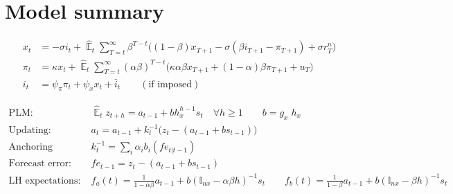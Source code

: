 \documentclass[11pt]{article}
\renewcommand{\[}{\begin{equation}}
\renewcommand{\]}{\end{equation}}
\DeclareMathOperator{\E}{\mathbb{E}}
\newcommand\blankpage{%
    \null
    \thispagestyle{empty}%
    \addtocounter{page}{-1}%
    \newpage}
\begin{document}
\afterpage{\blankpage}


    \clearpage
\appendix
\section{Model summary}

\vspace{-0.5cm}

\begin{align}
x_t &=  -\sigma i_t +\hat{\E}_t \sum_{T=t}^{\infty} \beta^{T-t }\big( (1-\beta)x_{T+1} - \sigma(\beta i_{T+1} - \pi_{T+1}) +\sigma r_T^n \big)  \label{A1}  \\
\pi_t &= \kappa x_t +\hat{\E}_t \sum_{T=t}^{\infty} (\alpha\beta)^{T-t }\big( \kappa \alpha \beta x_{T+1} + (1-\alpha)\beta \pi_{T+1} + u_T\big) \label{A2}  \\
i_t &= \psi_{\pi}\pi_t + \psi_{x} x_t  + \bar{i}_t \label{TR} \quad \quad (\text{if imposed})
\end{align}

\vspace{-1.2cm}

\begin{align}
\text{PLM:} \quad \quad & \hat{\E}_t z_{t+h}  =  a_{t-1} + bh_x^{h-1}s_t  \quad \forall h\geq 1 \quad \quad b = g_x\; h_x \quad \quad  \label{PLM} \\
\text{Updating:} \quad \quad & a_{t}  =a_{t-1} +k_t^{-1}\big(z_{t} -(a_{t-1}+b s_{t-1}) \big)  \label{A5} \\
\text{Anchoring function:} \quad \quad & k^{-1}_t  = \sum_i \alpha_i b_i(fe_{t|t-1}) \label{A6}\\
\text{Forecast error:} \quad \quad & fe_{t-1}  = z_t - (a_{t-1}+b s_{t-1}) \label{A7} \\
\text{LH expectations:} \quad \quad & f_a(t) = \frac{1}{1-\alpha\beta}a_{t-1}  + b(\mathbb{I}_{nx} - \alpha\beta h)^{-1}s_t \quad \quad  f_b(t) = \frac{1}{1-\beta}a_{t-1}  + b(\mathbb{I}_{nx} - \beta h)^{-1}s_t  \label{A8}
\end{align}

\vspace{-0.5cm}
\end{document}
